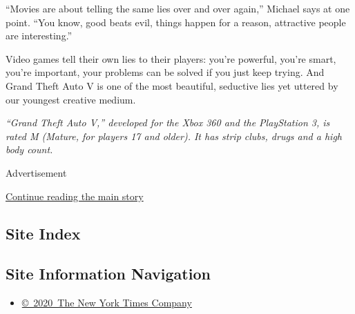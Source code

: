 ``Movies are about telling the same lies over and over again,'' Michael
says at one point. ``You know, good beats evil, things happen for a
reason, attractive people are interesting.''

Video games tell their own lies to their players: you're powerful,
you're smart, you're important, your problems can be solved if you just
keep trying. And Grand Theft Auto V is one of the most beautiful,
seductive lies yet uttered by our youngest creative medium.

\emph{``Grand Theft Auto V,'' developed for the Xbox 360 and the
PlayStation 3, is rated M (Mature, for players 17 and older). It has
strip clubs, drugs and a high body count.}

Advertisement

\protect\hyperlink{after-bottom}{Continue reading the main story}

\hypertarget{site-index}{%
\subsection{Site Index}\label{site-index}}

\hypertarget{site-information-navigation}{%
\subsection{Site Information
Navigation}\label{site-information-navigation}}

\begin{itemize}
\tightlist
\item
  \href{https://help.nytimes3xbfgragh.onion/hc/en-us/articles/115014792127-Copyright-notice}{©~2020~The
  New York Times Company}
\end{itemize}

